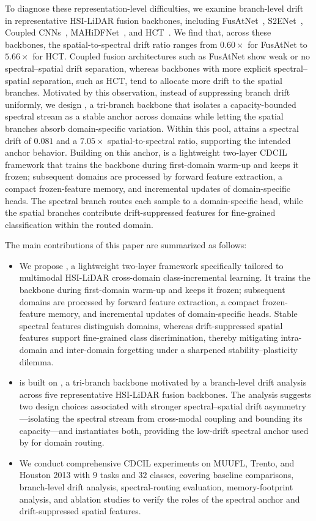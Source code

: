 To diagnose these representation-level difficulties, we examine branch-level drift in representative HSI-LiDAR fusion backbones, including FusAtNet~\cite{mohla2020fusatnet}, S2ENet~\cite{fang2022s2enet}, Coupled CNNs~\cite{hang2020coupled}, MAHiDFNet~\cite{li2022mahidfnet}, and HCT~\cite{ghosh2023hct}.
We find that, across these backbones, the spatial-to-spectral drift ratio ranges from $0.60\times$ for FusAtNet to $5.66\times$ for HCT.
Coupled fusion architectures such as FusAtNet show weak or no spectral--spatial drift separation, whereas backbones with more explicit spectral--spatial separation, such as HCT, tend to allocate more drift to the spatial branches.
Motivated by this observation, instead of suppressing branch drift uniformly, we design \backbonename{}, a tri-branch backbone that isolates a capacity-bounded spectral stream as a stable anchor across domains while letting the spatial branches absorb domain-specific variation.
Within this pool, \backbonename{} attains a spectral drift of $0.081$ and a $7.05\times$ spatial-to-spectral ratio, supporting the intended anchor behavior.
Building on this anchor, \methodname{} is a lightweight two-layer CDCIL framework that trains the backbone during first-domain warm-up and keeps it frozen; subsequent domains are processed by forward feature extraction, a compact frozen-feature memory, and incremental updates of domain-specific heads.
The spectral branch routes each sample to a domain-specific head, while the spatial branches contribute drift-suppressed features for fine-grained classification within the routed domain.

The main contributions of this paper are summarized as follows:
\begin{itemize}
    \item We propose \methodname{}, a lightweight two-layer framework specifically tailored to multimodal HSI-LiDAR cross-domain class-incremental learning. It trains the backbone during first-domain warm-up and keeps it frozen; subsequent domains are processed by forward feature extraction, a compact frozen-feature memory, and incremental updates of domain-specific heads. Stable spectral features distinguish domains, whereas drift-suppressed spatial features support fine-grained class discrimination, thereby mitigating intra-domain and inter-domain forgetting under a sharpened stability--plasticity dilemma.
    \item \methodname{} is built on \backbonename{}, a tri-branch backbone motivated by a branch-level drift analysis across five representative HSI-LiDAR fusion backbones. The analysis suggests two design choices associated with stronger spectral--spatial drift asymmetry---isolating the spectral stream from cross-modal coupling and bounding its capacity---and \backbonename{} instantiates both, providing the low-drift spectral anchor used by \methodname{} for domain routing.
    \item We conduct comprehensive CDCIL experiments on MUUFL, Trento, and Houston 2013 with $9$ tasks and $32$ classes, covering baseline comparisons, branch-level drift analysis, spectral-routing evaluation, memory-footprint analysis, and ablation studies to verify the roles of the spectral anchor and drift-suppressed spatial features.
\end{itemize}
